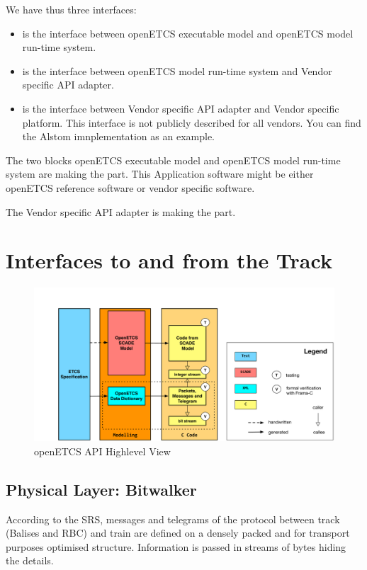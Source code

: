 \documentclass{template/openetcs_report}
\begin{document}
We have thus three interfaces:
\begin{itemize}
\item {}
 is the interface between openETCS
  executable model and openETCS model run-time system. 
\item {}
 is the interface between openETCS model
  run-time system and Vendor specific \gls{API} adapter.
\item {}
 is the interface between Vendor
  specific \gls{API} adapter and Vendor specific platform. This interface is
  not publicly described for all vendors. You can find the Alstom imnplementation as an example.
\end{itemize}

The two blocks openETCS executable model and openETCS model run-time
system are making the  part. This Application software might be either openETCS reference software or
vendor specific software.

The Vendor specific \gls{API} adapter is making the  part.

\section{Interfaces to and from the Track}

\begin{figure}[hbtp]
\centering
\includegraphics[width=\linewidth]{OpenETCS-Stack.pdf}
\caption{openETCS API Highlevel View}
\label{fig:apiHighLevel}
\end{figure}

\subsection{Physical Layer: Bitwalker}
According to the SRS, messages and telegrams of the protocol between track (Balises and RBC) and train are defined on a densely packed and for transport purposes optimised structure. Information is passed in streams of bytes hiding the details. 
\end{document}
